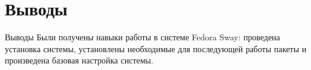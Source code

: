 \documentclass[
  ignorenonframetext,
  aspectratio=169,
  russian,
]{beamer}
\begin{document}
\section{Выводы}\label{ux432ux44bux432ux43eux434ux44b}

\begin{frame}{Выводы}
\label{ux432ux44bux432ux43eux434ux44b-1}
Были получены навыки работы в системе Fedora Sway: проведена установка
системы, установлены необходимые для последующей работы пакеты и
произведена базовая настройка системы.
\end{frame}
\end{document}
